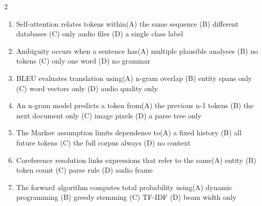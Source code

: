 \documentclass[a4paper]{article}
\begin{document}
\begin{multicols*}{2}
\begin{enumerate}
\item Self-attention relates tokens within\newline\hspace*{0.6em}(A) the same sequence \quad (B) different databases \newline\hspace*{0.6em}(C) only audio files \quad (D) a single class label
\item Ambiguity occurs when a sentence has\newline\hspace*{0.6em}(A) multiple plausible analyses \quad (B) no tokens \newline\hspace*{0.6em}(C) only one word \quad (D) no grammar
\item BLEU evaluates translation using\newline\hspace*{0.6em}(A) n-gram overlap \quad (B) entity spans only \newline\hspace*{0.6em}(C) word vectors only \quad (D) audio quality only
\item An n-gram model predicts a token from\newline\hspace*{0.6em}(A) the previous n-1 tokens \quad (B) the next document only \newline\hspace*{0.6em}(C) image pixels \quad (D) a parse tree only
\item The Markov assumption limits dependence to\newline\hspace*{0.6em}(A) a fixed history \quad (B) all future tokens \newline\hspace*{0.6em}(C) the full corpus always \quad (D) no context
\item Coreference resolution links expressions that refer to the same\newline\hspace*{0.6em}(A) entity \quad (B) token count \newline\hspace*{0.6em}(C) parse rule \quad (D) audio frame
\item The forward algorithm computes total probability using\newline\hspace*{0.6em}(A) dynamic programming \quad (B) greedy stemming \newline\hspace*{0.6em}(C) TF-IDF \quad (D) beam width only

\end{enumerate}
\end{multicols*}
\end{document}
